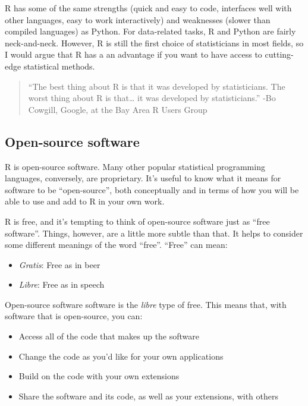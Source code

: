 \documentclass[]{book}
\providecommand{\tightlist}{%
  \setlength{\itemsep}{0pt}\setlength{\parskip}{0pt}}
\begin{document}
R has some of the same strengths (quick and easy to code, interfaces
well with other languages, easy to work interactively) and weaknesses
(slower than compiled languages) as Python. For data-related tasks, R
and Python are fairly neck-and-neck. However, R is still the first
choice of statisticians in most fields, so I would argue that R has a an
advantage if you want to have access to cutting-edge statistical
methods.

\begin{quote}
``The best thing about R is that it was developed by statisticians. The
worst thing about R is that\ldots{} it was developed by statisticians.''
-Bo Cowgill, Google, at the Bay Area R Users Group
\end{quote}

\subsection{Open-source software}\label{open-source-software}

R is open-source software. Many other popular statistical programming
languages, conversely, are proprietary. It's useful to know what it
means for software to be ``open-source'', both conceptually and in terms
of how you will be able to use and add to R in your own work.

R is free, and it's tempting to think of open-source software just as
``free software''. Things, however, are a little more subtle than that.
It helps to consider some different meanings of the word ``free''.
``Free'' can mean:

\begin{itemize}
\tightlist
\item
  \emph{Gratis}: Free as in beer
\item
  \emph{Libre}: Free as in speech
\end{itemize}

Open-source software software is the \emph{libre} type of free. This
means that, with software that is open-source, you can:

\begin{itemize}
\tightlist
\item
  Access all of the code that makes up the software
\item
  Change the code as you'd like for your own applications
\item
  Build on the code with your own extensions
\item
  Share the software and its code, as well as your extensions, with
  others
\end{itemize}
\end{document}
